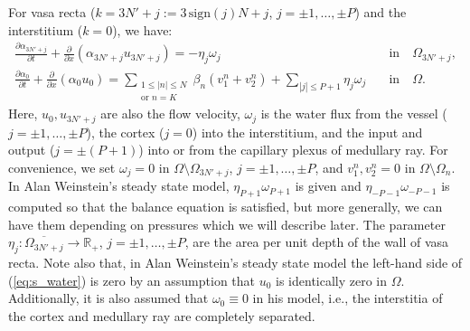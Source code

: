 \documentclass{article}
\begin{document}
For vasa recta ($k=3N'+j:=3\,\mathrm{sign}(j)N+j$, $j=\pm 1,\dots,\pm P$) and the interstitium ($k=0$), we have:
\begin{align}
    \frac{\partial \alpha_{3N'+j}}{\partial t} + \frac{\partial}{\partial x}(\alpha_{3N'+j}u_{3N'+j}) = -\eta_{j}\omega_{j}\qquad &\text{in}\quad \Omega_{3N'+j},\\
    \frac{\partial \alpha_0}{\partial t} + \frac{\partial}{\partial x}(\alpha_0u_0) = 
        \sum_{\substack{1\leq|n|\leq N\\\text{or } n=K}}\beta_n(v_{1}^n+v_{2}^n)+\sum_{|j|\leq P+1}\eta_j\omega_j \quad &\text{in}\quad \Omega.\label{eq:s_water}
\end{align}
Here, $u_0,u_{3N'+j}$ are also the flow velocity, $\omega_j$ is the water flux from the vessel ($j=\pm 1,\dots,\pm P$), the cortex ($j=0$) into the interstitium, and the input and output ($j=\pm(P+1)$) into or from the capillary plexus of medullary ray.
For convenience, we set $\omega_j = 0$ in $\Omega\setminus \Omega_{3N'+j}$, $j=\pm 1,\dots,\pm P$, and $v_1^n,v_2^n=0$ in $\Omega\setminus\Omega_n$.
In Alan Weinstein's steady state model, $\eta_{P+1}\omega_{P+1}$ is given and $\eta_{-P-1}\omega_{-P-1}$ is computed so that the balance equation is satisfied, but more generally, we can have them depending on pressures which we will describe later.
The parameter $\eta_j:\overline{\Omega_{3N'+j}}\to\mathbb{R}_+$, $j=\pm 1,\dots,\pm P$, are the area per unit depth of the wall of vasa recta.
Note also that, in Alan Weinstein's steady state model 
the left-hand side of (\ref{eq:s_water}) is zero by an assumption that $u_0$ is identically zero in $\Omega$.
Additionally, it is also assumed that $\omega_0\equiv 0$ in his model, i.e., the interstitia of the cortex and medullary ray are completely separated.

\end{document}

